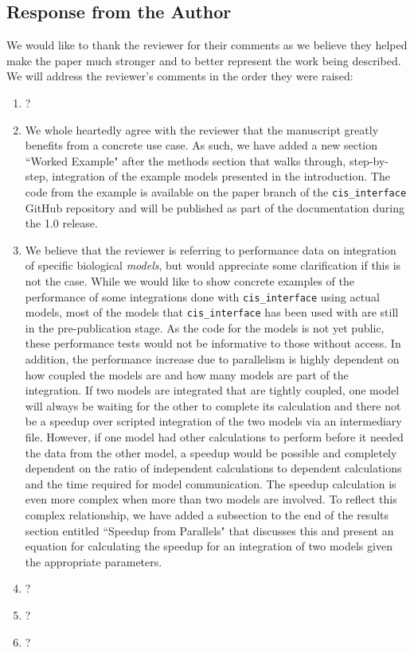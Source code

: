 \documentclass[11pt]{article}
\newcommand{\pkg}{{\tt cis\_interface}{}}
\begin{document}
\subsection{Response from the Author}

We would like to thank the reviewer for their comments as we believe they helped make the paper much stronger and to better represent the work being described. We will address the reviewer's comments in the order they were raised:
\begin{enumerate}
\item ?
\item We whole heartedly agree with the reviewer that the manuscript greatly benefits from a concrete use case. As such, we have added a new section ``Worked Example" after the methods section that walks through, step-by-step, integration of the example models presented in the introduction. The code from the example is available on the paper branch of the {\pkg} GitHub repository and will be published as part of the documentation during the 1.0 release.
\item We believe that the reviewer is referring to performance data on integration of specific biological \emph{models}, but would appreciate some clarification if this is not the case. While we would like to show concrete examples of the performance of some integrations done with {\pkg} using actual models, most of the models that {\pkg} has been used with are still in the pre-publication stage. As the code for the models is not yet public, these performance tests would not be informative to those without access. In addition, the performance increase due to parallelism is highly dependent on how coupled the models are and how many models are part of the integration. If two models are integrated that are tightly coupled, one model will always be waiting for the other to complete its calculation and there not be a speedup over scripted integration of the two models via an intermediary file. However, if one model had other calculations to perform before it needed the data from the other model, a speedup would be possible and completely dependent on the ratio of independent calculations to dependent calculations and the time required for model communication. The speedup calculation is even more complex when more than two models are involved. To reflect this complex relationship, we have added a subsection to the end of the results section entitled ``Speedup from Parallels" that discusses this and present an equation for calculating the speedup for an integration of two models given the appropriate parameters.
\item ?
\item ?
\item ?
\end{enumerate}
\end{document}
